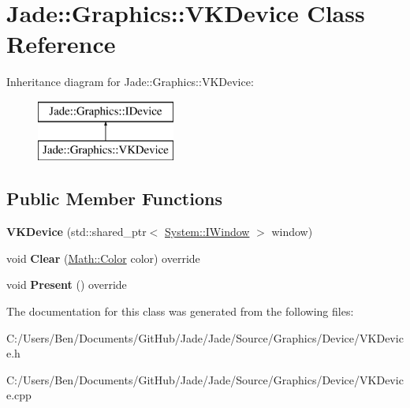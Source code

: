 \hypertarget{class_jade_1_1_graphics_1_1_v_k_device}{}\section{Jade\+:\+:Graphics\+:\+:V\+K\+Device Class Reference}
\label{class_jade_1_1_graphics_1_1_v_k_device}
Inheritance diagram for Jade\+:\+:Graphics\+:\+:V\+K\+Device\+:\begin{figure}[H]
\begin{center}
\leavevmode
\includegraphics[height=2.000000cm]{class_jade_1_1_graphics_1_1_v_k_device}
\end{center}
\end{figure}
\subsection*{Public Member Functions}
\begin{DoxyCompactItemize}
\item 
\hypertarget{class_jade_1_1_graphics_1_1_v_k_device_ae8c46924cfda44f10d9c4d919492bf02}{}{\bfseries V\+K\+Device} (std\+::shared\+\_\+ptr$<$ \hyperlink{struct_jade_1_1_system_1_1_i_window}{System\+::\+I\+Window} $>$ window)\label{class_jade_1_1_graphics_1_1_v_k_device_ae8c46924cfda44f10d9c4d919492bf02}

\item 
\hypertarget{class_jade_1_1_graphics_1_1_v_k_device_aba3e595f7647339eb3bb0883a0b8754c}{}void {\bfseries Clear} (\hyperlink{struct_jade_1_1_math_1_1_color}{Math\+::\+Color} color) override\label{class_jade_1_1_graphics_1_1_v_k_device_aba3e595f7647339eb3bb0883a0b8754c}

\item 
\hypertarget{class_jade_1_1_graphics_1_1_v_k_device_a262ae03683d38b7f294e5750aa36a5df}{}void {\bfseries Present} () override\label{class_jade_1_1_graphics_1_1_v_k_device_a262ae03683d38b7f294e5750aa36a5df}

\end{DoxyCompactItemize}


The documentation for this class was generated from the following files\+:\begin{DoxyCompactItemize}
\item 
C\+:/\+Users/\+Ben/\+Documents/\+Git\+Hub/\+Jade/\+Jade/\+Source/\+Graphics/\+Device/V\+K\+Device.\+h\item 
C\+:/\+Users/\+Ben/\+Documents/\+Git\+Hub/\+Jade/\+Jade/\+Source/\+Graphics/\+Device/V\+K\+Device.\+cpp\end{DoxyCompactItemize}
